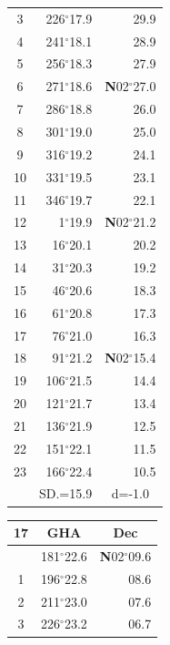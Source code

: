 \documentclass[10pt, a4paper]{report}
\begin{document}
\begin{scriptsize}
\begin{tabular*}{0.2\textwidth}[t]{@{\extracolsep{\fill}}|c|rr|}
3 & 226$^\circ$17.9 & \raisebox{0.24ex}{\boldmath$\cdot$~\boldmath$\cdot$~~}29.9\\
4 & 241$^\circ$18.1 & 28.9\\
5 & 256$^\circ$18.3 & 27.9\\[2Pt]
6 & 271$^\circ$18.6 & \textbf{N}02$^\circ$27.0\\
7 & 286$^\circ$18.8 & 26.0\\
8 & 301$^\circ$19.0 & 25.0\\
9 & 316$^\circ$19.2 & \raisebox{0.24ex}{\boldmath$\cdot$~\boldmath$\cdot$~~}24.1\\
10 & 331$^\circ$19.5 & 23.1\\
11 & 346$^\circ$19.7 & 22.1\\[2Pt]
12 & 1$^\circ$19.9 & \textbf{N}02$^\circ$21.2\\
13 & 16$^\circ$20.1 & 20.2\\
14 & 31$^\circ$20.3 & 19.2\\
15 & 46$^\circ$20.6 & \raisebox{0.24ex}{\boldmath$\cdot$~\boldmath$\cdot$~~}18.3\\
16 & 61$^\circ$20.8 & 17.3\\
17 & 76$^\circ$21.0 & 16.3\\[2Pt]
18 & 91$^\circ$21.2 & \textbf{N}02$^\circ$15.4\\
19 & 106$^\circ$21.5 & 14.4\\
20 & 121$^\circ$21.7 & 13.4\\
21 & 136$^\circ$21.9 & \raisebox{0.24ex}{\boldmath$\cdot$~\boldmath$\cdot$~~}12.5\\
22 & 151$^\circ$22.1 & 11.5\\
23 & 166$^\circ$22.4 & 10.5\\
\hline
\rule{0pt}{2.4ex} & \multicolumn{1}{c}{SD.=15.9} & \multicolumn{1}{c|}{d=-1.0}\\
\hline
\end{tabular*}\noindent
\begin{tabular*}{0.2\textwidth}[t]{@{\extracolsep{\fill}}|c|rr|}
\hline
\multicolumn{1}{|c|}{\rule{0pt}{2.6ex}\textbf{17}} & \multicolumn{1}{c}{\textbf{GHA}} & \multicolumn{1}{c|}{\textbf{Dec}}\\
\hline\rule{0pt}{2.6ex}\noindent
0 & 181$^\circ$22.6 & \textbf{N}02$^\circ$09.6\\
1 & 196$^\circ$22.8 & 08.6\\
2 & 211$^\circ$23.0 & 07.6\\
3 & 226$^\circ$23.2 & \raisebox{0.24ex}{\boldmath$\cdot$~\boldmath$\cdot$~~}06.7\\

\end{tabular*}
\end{scriptsize}
\end{document}
